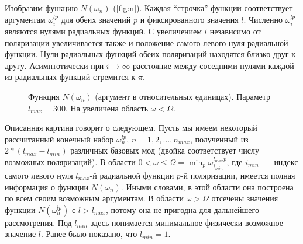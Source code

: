 \documentclass[12pt,a4paper]{article}
\begin{document}
        Изобразим функцию $N(\omega_n)$ (\autoref{fig:n}). Каждая \enquote{строчка} функции соответствует аргументам $\omega^{lp}_i$ для обеих значений $p$ и фиксированного значения $l$. Численно $\omega^{lp}_i$ являются нулями радиальных функций. С увеличением $l$ независимо от поляризации увеличивается также и положение самого левого нуля радиальной функции. Нули радиальных функций обеих поляризаций находятся близко друг к другу. Асимптотически при $i \to \infty$ расстояние между соседними нулями каждой из радиальных функций стремится к $\pi$.
        \begin{figure}[h]
            \centering
            \subfloat[][]{%
                \label{fig:n_all}%
                \texttt{[image: n]}}%
            \hspace{8pt}%
            \hspace{8pt}%
            \caption[]{Функция $N(\omega_n)$ (аргумент в относительных единицах). Параметр $l_{max} = 300$. На  увеличена область $\omega < \Omega$. %
            } %
            \label{fig:n}%
        \end{figure}

        Описанная картина говорит о следующем. Пусть мы имеем некоторый рассчитанный конечный набор $\omega^{lp}_n$, $n = 1, 2, \dots, n_{max}$, полученный из $2 * (l_{max} - l_{min})$ различных базовых мод (двойка соответствует числу возможных поляризаций). В области $0 < \omega \le \Omega = \min_p{\omega^{l_{max}p}_{i_{min}}}$, где $i_{min}$~--- индекс самого левого нуля $l_{max}$-й радиальной функции $p$-й поляризации, имеется полная информация о функции $N(\omega_n)$. Иными словами, в этой области она построена по всем своим возможным аргументам. В области $\omega > \Omega$ отсечены значения функции $N(\omega^{lp}_n)$ с $l > l_{max}$, потому она не пригодна для дальнейшего рассмотрения. Под $l_{min}$ здесь понимается минимальное физически возможное значение $l$. Ранее было показано, что $l_{min} = 1$.
\end{document}
